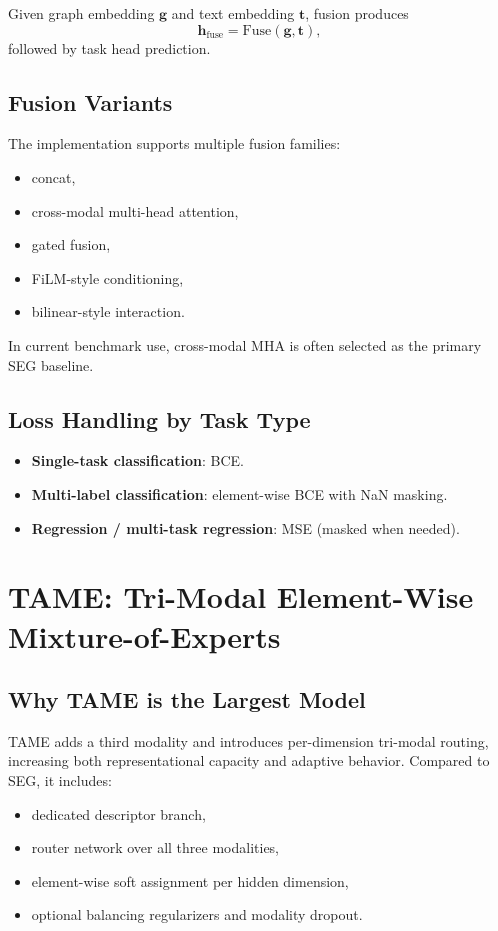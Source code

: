 \documentclass[11pt,a4paper]{article}
\begin{document}
Given graph embedding $\mathbf{g}$ and text embedding $\mathbf{t}$, fusion produces
\begin{equation}
\mathbf{h}_{\text{fuse}} = \mathrm{Fuse}(\mathbf{g}, \mathbf{t}),
\end{equation}
followed by task head prediction.

\subsection{Fusion Variants}
The implementation supports multiple fusion families:
\begin{itemize}
    \item concat,
    \item cross-modal multi-head attention,
    \item gated fusion,
    \item FiLM-style conditioning,
    \item bilinear-style interaction.
\end{itemize}

In current benchmark use, cross-modal MHA is often selected as the primary SEG baseline.

\subsection{Loss Handling by Task Type}
\begin{itemize}
    \item \textbf{Single-task classification}: BCE.
    \item \textbf{Multi-label classification}: element-wise BCE with NaN masking.
    \item \textbf{Regression / multi-task regression}: MSE (masked when needed).
\end{itemize}

\section{TAME: Tri-Modal Element-Wise Mixture-of-Experts}
\subsection{Why TAME is the Largest Model}
TAME adds a third modality and introduces per-dimension tri-modal routing, increasing both representational capacity and adaptive behavior. Compared to SEG, it includes:
\begin{itemize}
    \item dedicated descriptor branch,
    \item router network over all three modalities,
    \item element-wise soft assignment per hidden dimension,
    \item optional balancing regularizers and modality dropout.
\end{itemize}
\end{document}
